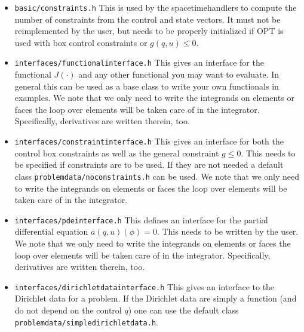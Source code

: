 \begin{itemize}
  \item \texttt{basic/constraints.h} This is used by the spacetimehandlers to 
    compute the number of constraints from the control and state vectors. 
    It must not be reimplemented by the user, but needs to be properly 
    initialized if OPT is used with box control constraints or $g(q,u) \le 0$.
  \item \texttt{interfaces/functionalinterface.h} This gives an interface 
    for the functional $J(\cdot)$ and any other functional you may want to evaluate.
    In general this can be used as a base class to write your own functionals 
    in examples. We note that we only need to write the integrands on 
    elements or faces the loop over elements will be taken care of in the integrator.
    Specifically, derivatives are written therein, too.
  \item \texttt{interfaces/constraintinterface.h} This gives an interface for both 
    the control box constraints as well as the general constraint $g \le 0$. This 
    needs to be specified if constraints are to be used. If they are not needed 
    a default class \texttt{problemdata/noconstraints.h} can be used. We note that we only 
    need to write the integrands on 
    elements or faces the loop over elements will be taken care of in the integrator.
  \item \texttt{interfaces/pdeinterface.h} This defines an interface for the 
    partial differential equation $a(q,u)(\phi) = 0$. This needs to be written
    by the user. We note that we only need to write the integrands on 
    elements or faces the loop over elements will be taken care of in the integrator.
    Specifically, derivatives are written therein, too.
  \item \texttt{interfaces/dirichletdatainterface.h} This gives an interface to the 
    Dirichlet data for a problem. If the Dirichlet data are simply a function 
    (and do not depend on the control $q$) one can use the default class\\
    \texttt{problemdata/simpledirichletdata.h}.
\end{itemize}




